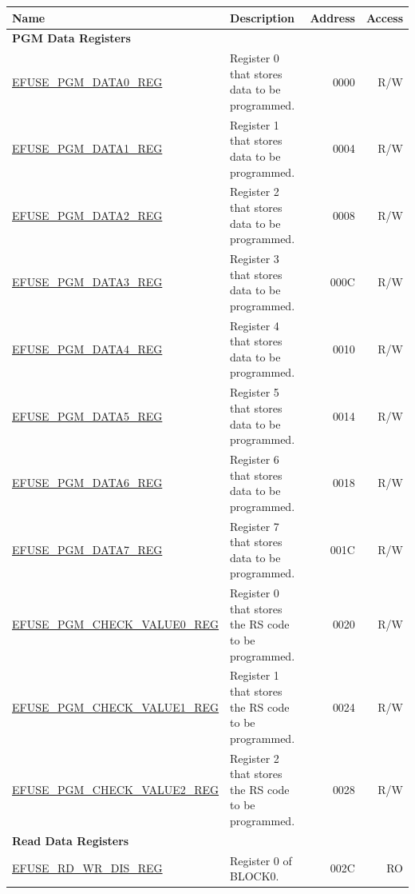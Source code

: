 \begin{longtable}{ | m{6cm} | m{7.2cm} | r| r | }
\hline\rowcolor{lightgray}
Name & Description &  Address & Access \\ \hline
\endhead
\multicolumn{4}{|l|}{\textbf{PGM Data Registers}} \\ \hline
\hyperref[regdesc:EFUSEPGMDATANREG]{EFUSE\_PGM\_DATA0\_REG} & Register 0 that stores data to be programmed. & \hexprefix{}0000 & R/W \\ \hline
\hyperref[regdesc:EFUSEPGMDATANREG]{EFUSE\_PGM\_DATA1\_REG} & Register 1 that stores data to be programmed. & \hexprefix{}0004 & R/W \\ \hline
\hyperref[regdesc:EFUSEPGMDATANREG]{EFUSE\_PGM\_DATA2\_REG} & Register 2 that stores data to be programmed. & \hexprefix{}0008 & R/W \\ \hline
\hyperref[regdesc:EFUSEPGMDATANREG]{EFUSE\_PGM\_DATA3\_REG} & Register 3 that stores data to be programmed. & \hexprefix{}000C & R/W \\ \hline
\hyperref[regdesc:EFUSEPGMDATANREG]{EFUSE\_PGM\_DATA4\_REG} & Register 4 that stores data to be programmed. & \hexprefix{}0010 & R/W \\ \hline
\hyperref[regdesc:EFUSEPGMDATANREG]{EFUSE\_PGM\_DATA5\_REG} & Register 5 that stores data to be programmed. & \hexprefix{}0014 & R/W \\ \hline
\hyperref[regdesc:EFUSEPGMDATANREG]{EFUSE\_PGM\_DATA6\_REG} & Register 6 that stores data to be programmed. & \hexprefix{}0018 & R/W \\ \hline
\hyperref[regdesc:EFUSEPGMDATANREG]{EFUSE\_PGM\_DATA7\_REG} & Register 7 that stores data to be programmed. & \hexprefix{}001C & R/W \\ \hline
\hyperref[regdesc:EFUSEPGMCHECKVALUENREG]{EFUSE\_PGM\_CHECK\_VALUE0\_REG} & Register 0 that stores the RS code to be programmed. & \hexprefix{}0020 & R/W \\ \hline
\hyperref[regdesc:EFUSEPGMCHECKVALUENREG]{EFUSE\_PGM\_CHECK\_VALUE1\_REG} & Register 1 that stores the RS code to be programmed. & \hexprefix{}0024 & R/W \\ \hline
\hyperref[regdesc:EFUSEPGMCHECKVALUENREG]{EFUSE\_PGM\_CHECK\_VALUE2\_REG} & Register 2 that stores the RS code to be programmed. & \hexprefix{}0028 & R/W \\ \hline
\multicolumn{4}{|l|}{\textbf{Read Data Registers}} \\ \hline
\hyperref[regdesc:EFUSERDWRDISREG]{EFUSE\_RD\_WR\_DIS\_REG} & Register 0 of BLOCK0. & \hexprefix{}002C & RO \\ \hline

\end{longtable}
